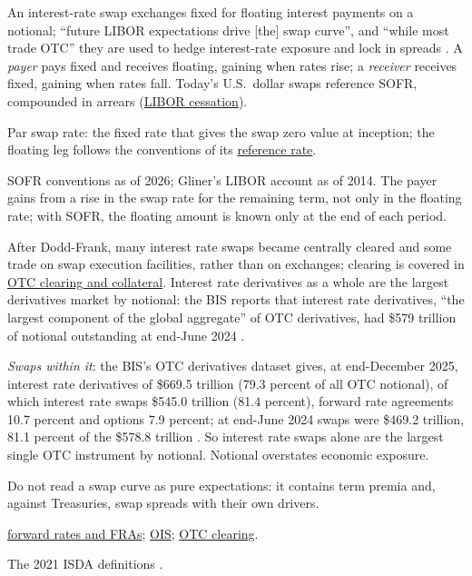 \begin{qfdefinition}\label{def:interest-rate-swaps}
 An interest-rate swap exchanges fixed for floating interest payments on a notional; ``future LIBOR expectations drive [the] swap curve'', and ``while most trade OTC'' they are used to hedge interest-rate exposure and lock in spreads \citep[chap.~9, sec.\ ``Interest Rate Swaps'', PDF p.~256]{s7-gliner}. A \emph{payer} pays fixed and receives floating, gaining when rates rise; a \emph{receiver} receives fixed, gaining when rates fall. Today's U.S.\ dollar swaps reference SOFR, compounded in arrears (\hyperref[meth:policy-path-ois-futures]{LIBOR cessation}).

 Par swap rate: the fixed rate that gives the swap zero value at inception; the floating leg follows the conventions of its \hyperref[def:interest-rate-measures]{reference rate}.

 SOFR conventions as of 2026; Gliner's LIBOR account as of 2014. The payer gains from a rise in the swap rate for the remaining term, not only in the floating rate; with SOFR, the floating amount is known only at the end of each period.

 After Dodd-Frank, many interest rate swaps became centrally cleared and some trade on swap execution facilities, rather than on exchanges; clearing is covered in \hyperref[mech:otc-clearing-collateral]{OTC clearing and collateral}. Interest rate derivatives as a whole are the largest derivatives market by notional: the BIS reports that interest rate derivatives, ``the largest component of the global aggregate'' of OTC derivatives, had \$579 trillion of notional outstanding at end-June 2024 \citep[release of 21 November 2024]{bis-otc-2024h1}.

\emph{Swaps within it}: the BIS's OTC derivatives dataset gives, at end-December 2025, interest rate derivatives of \$669.5 trillion (79.3 percent of all OTC notional), of which interest rate swaps \$545.0 trillion (81.4 percent), forward rate agreements 10.7 percent and options 7.9 percent; at end-June 2024 swaps were \$469.2 trillion, 81.1 percent of the \$578.8 trillion \citep[bulk file \nolinkurl{WS_OTC_DERIV2}, net-net notional, all reporting countries, counterparties, currencies and maturities]{bis-otc-dataset}. So interest rate swaps alone are the largest single OTC instrument by notional. Notional overstates economic exposure.

 Do not read a swap curve as pure expectations: it contains term premia and, against Treasuries, swap spreads with their own drivers.

 \hyperref[mod:forward-rates-fra]{forward rates and FRAs}; \hyperref[meth:policy-path-ois-futures]{OIS}; \hyperref[mech:otc-clearing-collateral]{OTC clearing}.

 The 2021 ISDA definitions \citep{gap-rates-isda-definitions}.

\end{qfdefinition}
